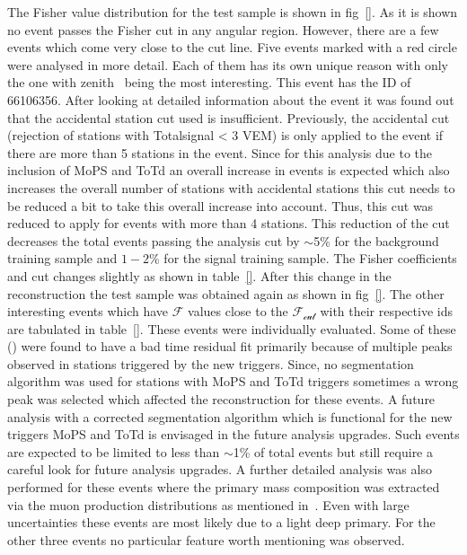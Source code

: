 The Fisher value distribution for the test sample is shown in fig~\ref{}. As it is shown no event passes the Fisher cut in any angular region. However, there are a few events which come very close to the cut line. Five events marked with a red circle were analysed in more detail. Each of them has its own unique reason with only the one with zenith~ being the most interesting. This event has the ID of 66106356. After looking at detailed information about the event it was found out that the accidental station cut used is insufficient. Previously, the  accidental cut (rejection of stations with Totalsignal < 3 VEM) is only applied to the event if there are more than 5 stations in the event. Since for this analysis due to the inclusion of MoPS and ToTd an overall increase in events is expected which also increases the overall number of stations with accidental stations this cut needs to be reduced a bit to take this overall increase into account. Thus, this cut was reduced to apply for events with more than 4 stations. This reduction of the cut decreases the total events passing the analysis cut by $\sim$5\% for the background training sample and $1-2$\% for the signal training sample. The Fisher coefficients and cut changes slightly as shown in table~\ref{}. After this change in the reconstruction the test sample was obtained again as shown in fig~\ref{}. The other interesting events which have $\mathcal{F}$ values close to the $\mathcal{F_{cut}}$ with their respective ids are tabulated in table~\ref{}. These events were individually evaluated. Some of these () were found to have a bad time residual fit primarily because of multiple peaks observed in stations triggered by the new triggers. Since, no segmentation algorithm was used for stations with MoPS and ToTd triggers sometimes a wrong peak was selected which affected the reconstruction for these events. A future analysis with a corrected segmentation algorithm which is functional for the new triggers MoPS and ToTd is envisaged in the future analysis upgrades. Such events are expected to be limited to less than $\sim$1\% of total events but still require a careful look for future analysis upgrades. A further detailed analysis was also performed for these events where the primary mass composition was extracted via the muon production distributions as mentioned in~\cite{PierreAuger:2014zay}. Even with large uncertainties these events are most likely due to a light deep primary. For the other three events no particular feature worth mentioning was observed. 


